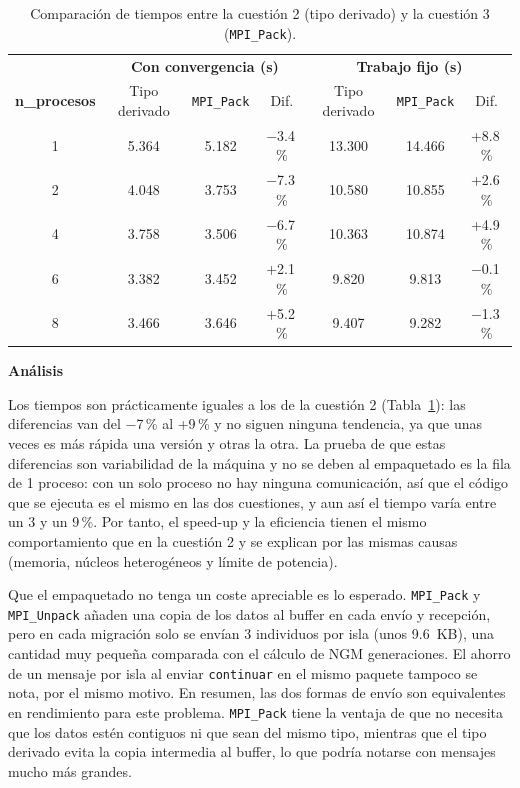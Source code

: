 \documentclass[12pt]{article}
\begin{document}
\begin{enumerate}
\begin{table}[htbp]
\centering
\begin{tabular}{c|ccc|ccc}
\toprule
& \multicolumn{3}{c|}{\textbf{Con convergencia (s)}} & \multicolumn{3}{c}{\textbf{Trabajo fijo (s)}} \\
\textbf{n\_procesos} & Tipo derivado & \texttt{MPI\_Pack} & Dif. & Tipo derivado & \texttt{MPI\_Pack} & Dif. \\
\midrule
1 & 5.364 & 5.182 & $-$3.4\,\% & 13.300 & 14.466 & +8.8\,\% \\
2 & 4.048 & 3.753 & $-$7.3\,\% & 10.580 & 10.855 & +2.6\,\% \\
4 & 3.758 & 3.506 & $-$6.7\,\% & 10.363 & 10.874 & +4.9\,\% \\
6 & 3.382 & 3.452 & +2.1\,\% & 9.820 & 9.813 & $-$0.1\,\% \\
8 & 3.466 & 3.646 & +5.2\,\% & 9.407 & 9.282 & $-$1.3\,\% \\
\bottomrule
\end{tabular}
\caption{Comparación de tiempos entre la cuestión 2 (tipo derivado) y la cuestión 3 (\texttt{MPI\_Pack}).}
\label{tab:c3_comparacion}
\end{table}

\vspace{0.5cm}

\medskip
\noindent\textbf{Análisis}\par
\smallskip

Los tiempos son prácticamente iguales a los de la cuestión 2 (Tabla~\ref{tab:c3_comparacion}): las diferencias van del $-$7\,\% al +9\,\% y no siguen ninguna tendencia, ya que unas veces es más rápida una versión y otras la otra. La prueba de que estas diferencias son variabilidad de la máquina y no se deben al empaquetado es la fila de 1 proceso: con un solo proceso no hay ninguna comunicación, así que el código que se ejecuta es el mismo en las dos cuestiones, y aun así el tiempo varía entre un 3 y un 9\,\%. Por tanto, el speed-up y la eficiencia tienen el mismo comportamiento que en la cuestión 2 y se explican por las mismas causas (memoria, núcleos heterogéneos y límite de potencia).

Que el empaquetado no tenga un coste apreciable es lo esperado. \texttt{MPI\_Pack} y \texttt{MPI\_Unpack} añaden una copia de los datos al buffer en cada envío y recepción, pero en cada migración solo se envían 3 individuos por isla (unos 9.6~KB), una cantidad muy pequeña comparada con el cálculo de NGM generaciones. El ahorro de un mensaje por isla al enviar \texttt{continuar} en el mismo paquete tampoco se nota, por el mismo motivo. En resumen, las dos formas de envío son equivalentes en rendimiento para este problema. \texttt{MPI\_Pack} tiene la ventaja de que no necesita que los datos estén contiguos ni que sean del mismo tipo, mientras que el tipo derivado evita la copia intermedia al buffer, lo que podría notarse con mensajes mucho más grandes.



\end{enumerate}
\end{document}
